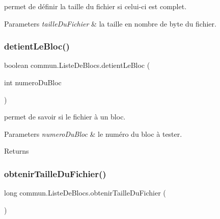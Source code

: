 permet de définir la taille du fichier si celui-\/ci est complet. 


\begin{DoxyParams}{Parameters}
{\em taille\+Du\+Fichier} & la taille en nombre de byte du fichier. \\
\hline
\end{DoxyParams}
\mbox{\label{classcommun_1_1ListeDeBlocs_a2a41b1d4ac1c526012a09f415acd5bfe}} 
\subsubsection{\texorpdfstring{detient\+Le\+Bloc()}{detientLeBloc()}}
{\footnotesize\ttfamily boolean commun.\+Liste\+De\+Blocs.\+detient\+Le\+Bloc (\begin{DoxyParamCaption}\item[{int}]{numero\+Du\+Bloc }\end{DoxyParamCaption})\hspace{0.3cm}{\ttfamily [inline]}}



permet de savoir si le fichier à un bloc. 


\begin{DoxyParams}{Parameters}
{\em numero\+Du\+Bloc} & le numéro du bloc à tester. \\
\hline
\end{DoxyParams}
\begin{DoxyReturn}{Returns}

\end{DoxyReturn}
\mbox{\label{classcommun_1_1ListeDeBlocs_a52a7e4ed2a3e31d0f1ee2f0c62f8fef0}} 
\subsubsection{\texorpdfstring{obtenir\+Taille\+Du\+Fichier()}{obtenirTailleDuFichier()}}
{\footnotesize\ttfamily long commun.\+Liste\+De\+Blocs.\+obtenir\+Taille\+Du\+Fichier (\begin{DoxyParamCaption}{ }\end{DoxyParamCaption})\hspace{0.3cm}{\ttfamily [inline]}}



